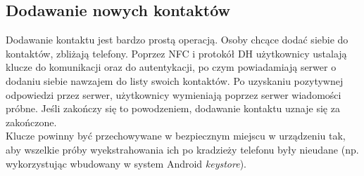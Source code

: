\documentclass{article}
\begin{document}
%
%
%
%



\subsection{Dodawanie nowych kontaktów}

Dodawanie kontaktu jest bardzo prostą operacją. Osoby chcące dodać siebie do kontaktów, zbliżają telefony. Poprzez NFC
i protokół DH użytkownicy ustalają klucze do komunikacji oraz do autentykacji, po czym powiadamiają serwer o dodaniu siebie nawzajem
do listy swoich kontaktów. Po uzyskaniu
pozytywnej odpowiedzi przez serwer, użytkownicy wymieniają poprzez serwer wiadomości próbne. Jeśli zakończy się to powodzeniem,
dodawanie kontaktu uznaje się za zakończone.\\

Klucze powinny być przechowywane w bezpiecznym miejscu w urządzeniu tak, aby wszelkie próby wyekstrahowania ich po kradzieży
telefonu były nieudane (np. wykorzystując wbudowany w system Android \emph{keystore}).
\end{document}
